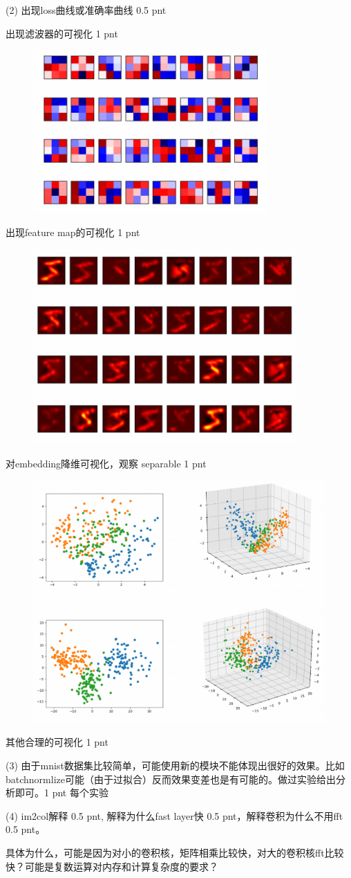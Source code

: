 \documentclass[12pt]{article}
\begin{document}
(2) 出现loss曲线或准确率曲线 0.5 pnt 

出现滤波器的可视化 1 pnt

\begin{figure}[h]
	\includegraphics[width=.5\textwidth]{fig/2018-05-03-21-26-12.png}
\end{figure}

出现feature map的可视化 1 pnt

\begin{figure}[h]
	\includegraphics[width=.5\textwidth]{fig/2018-05-03-21-25-41.png}
\end{figure}

对embedding降维可视化，观察 separable 1 pnt 

\begin{figure}[h]
	\includegraphics[width=.9\textwidth]{fig/2018-05-03-21-26-51.png}
\end{figure}

其他合理的可视化 1 pnt 

(3) 由于mnist数据集比较简单，可能使用新的模块不能体现出很好的效果。比如batchnormlize可能（由于过拟合）反而效果变差也是有可能的。做过实验给出分析即可。1 pnt 每个实验

(4) im2col解释 0.5 pnt, 解释为什么fast layer快 0.5 pnt，解释卷积为什么不用fft 0.5 pnt。 

具体为什么，可能是因为对小的卷积核，矩阵相乘比较快，对大的卷积核fft比较快？可能是复数运算对内存和计算复杂度的要求？
\end{document}
